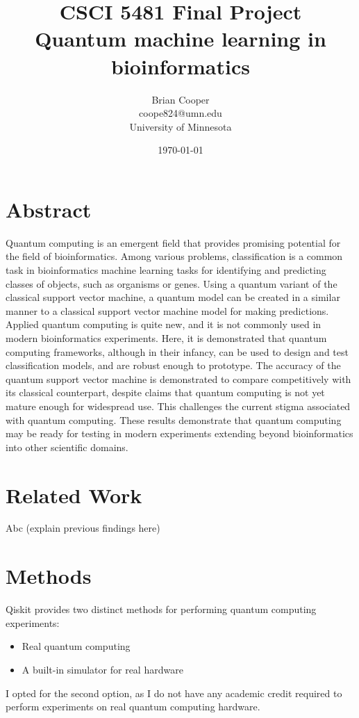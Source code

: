 \documentclass{article}
\title{%
  CSCI 5481 Final Project \\
  \large Quantum machine learning in bioinformatics
}
\author{Brian Cooper \\ coope824@umn.edu \\ University of Minnesota}
\date{\today}
\begin{document}
\maketitle

\section{Abstract}
  Quantum computing is an emergent field that provides promising potential for the field of bioinformatics. Among various problems, classification is a common task in bioinformatics machine learning tasks for identifying and predicting classes of objects, such as organisms or genes. Using a quantum variant of the classical support vector machine, a quantum model can be created in a similar manner to a classical support vector machine model for making predictions. Applied quantum computing is quite new, and it is not commonly used in modern bioinformatics experiments. Here, it is demonstrated that quantum computing frameworks, although in their infancy, can be used to design and test classification models, and are robust enough to prototype. The accuracy of the quantum support vector machine is demonstrated to compare competitively with its classical counterpart, despite claims that quantum computing is not yet mature enough for widespread use. This challenges the current stigma associated with quantum computing. These results demonstrate that quantum computing may be ready for testing in modern experiments extending beyond bioinformatics into other scientific domains.

\section{Related Work}
  Abc (explain previous findings here)

\section{Methods}
  Qiskit provides two distinct methods for performing quantum computing experiments:

  \begin{itemize}
    \item{Real quantum computing}
    \item{A built-in simulator for real hardware}
  \end{itemize}

  I opted for the second option, as I do not have any academic credit required to perform experiments on real quantum computing hardware. \\
\end{document}
